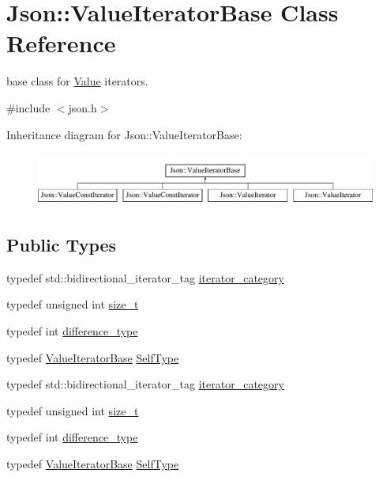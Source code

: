 \hypertarget{class_json_1_1_value_iterator_base}{}\section{Json\+:\+:Value\+Iterator\+Base Class Reference}
\label{class_json_1_1_value_iterator_base}


base class for \hyperlink{class_json_1_1_value}{Value} iterators.  




{\ttfamily \#include $<$json.\+h$>$}

Inheritance diagram for Json\+:\+:Value\+Iterator\+Base\+:\begin{figure}[H]
\begin{center}
\leavevmode
\includegraphics[height=1.772152cm]{class_json_1_1_value_iterator_base}
\end{center}
\end{figure}
\subsection*{Public Types}
\begin{DoxyCompactItemize}
\item 
typedef std\+::bidirectional\+\_\+iterator\+\_\+tag \hyperlink{class_json_1_1_value_iterator_base_a02fd11a4fbdc0007da1e8bcf5e6b83c3}{iterator\+\_\+category}
\item 
typedef unsigned int \hyperlink{class_json_1_1_value_iterator_base_a9d3a3c7ce5cdefe23cb486239cf07bb5}{size\+\_\+t}
\item 
typedef int \hyperlink{class_json_1_1_value_iterator_base_a4e44bf8cbd17ec8d6e2c185904a15ebd}{difference\+\_\+type}
\item 
typedef \hyperlink{class_json_1_1_value_iterator_base}{Value\+Iterator\+Base} \hyperlink{class_json_1_1_value_iterator_base_a9d2a940d03ea06d20d972f41a89149ee}{Self\+Type}
\item 
typedef std\+::bidirectional\+\_\+iterator\+\_\+tag \hyperlink{class_json_1_1_value_iterator_base_a02fd11a4fbdc0007da1e8bcf5e6b83c3}{iterator\+\_\+category}
\item 
typedef unsigned int \hyperlink{class_json_1_1_value_iterator_base_a9d3a3c7ce5cdefe23cb486239cf07bb5}{size\+\_\+t}
\item 
typedef int \hyperlink{class_json_1_1_value_iterator_base_a4e44bf8cbd17ec8d6e2c185904a15ebd}{difference\+\_\+type}
\item 
typedef \hyperlink{class_json_1_1_value_iterator_base}{Value\+Iterator\+Base} \hyperlink{class_json_1_1_value_iterator_base_a9d2a940d03ea06d20d972f41a89149ee}{Self\+Type}
\end{DoxyCompactItemize}
